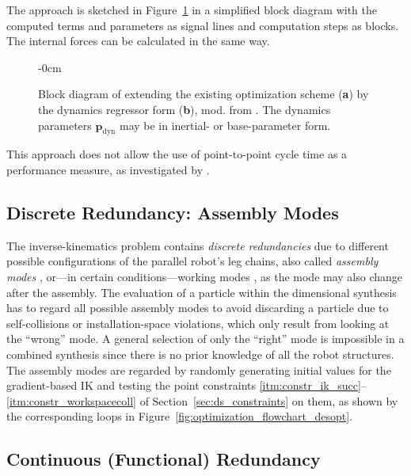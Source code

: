 The approach is sketched in Figure~\ref{fig:optimization_flowchart_desopt_plin} in a simplified block diagram with the computed terms and parameters as signal lines and computation steps as blocks.
The internal forces can be calculated in the same way.
\vspace{-6pt}
\begin{figure}[H]
\begin{adjustwidth}{-\extralength}{0cm}
\centering
\graphicspath{{Figures/}}

\end{adjustwidth}
\caption{Block diagram of extending the existing optimization scheme (\textbf{a}) by the dynamics regressor form (\textbf{b}), mod. from \cite{SchapplerTapOrt2019b}. The dynamics parameters $\bm{p}_{\mathrm{dyn}}$ may be in inertial- or base-parameter form.}
\label{fig:optimization_flowchart_desopt_plin}
\end{figure}
%
This approach does not allow {the use of} point-to-point cycle time as a performance measure, as investigated by \cite{PetterssonAndKru2005,PetterssonOel2009,TarkianPerOelFen2011}. %
%
%
%



\subsection{{Discrete Redundancy: Assembly Modes}}
\label{sec:dimsynth_assemblymode}

The inverse-kinematics problem contains \emph{discrete redundancies} due to different possible configurations of the parallel robot's leg chains, also called \emph{assembly modes} \cite{Merlet2006}, or---in certain conditions---working modes \cite{RevelesWenoth2016}, as the mode may also change after the assembly. %
The evaluation of a particle within the dimensional synthesis has to regard all possible assembly modes to avoid discarding a particle due to self-collisions or installation-space violations, which only result from looking at the ``wrong'' mode.
A general selection of only the ``right'' mode is impossible in a combined synthesis since there is no prior knowledge of all the robot structures.
%
%
The assembly modes are regarded by randomly generating initial values for the gradient-based IK and testing the point constraints \ref{itm:constr_ik_succ}--\ref{itm:constr_workspacecoll} of Section~\ref{sec:ds_constraints} on them, as shown by the corresponding loops in Figure~\ref{fig:optimization_flowchart_desopt}.
%

\subsection{{Continuous (Functional) Redundancy}}
\label{sec:dimsynth_taskred}

